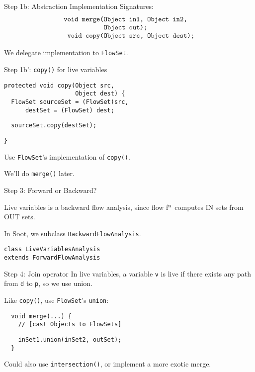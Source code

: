 \begin{slide}{Step 1b: Abstraction Implementation}
Signatures:
{\small 
\[ \mbox{\tt \begin{tabular}{r@{}l}
                 void merge(&Object in1, Object in2,\\
                            &Object out);\\
                 void copy(&Object src, Object dest);
\end{tabular}}\]
}

We delegate implementation to {\tt FlowSet}.
\end{slide}

\begin{slide}{Step 1b': {\tt copy()} for live variables}
\begin{verbatim}
protected void copy(Object src, 
                    Object dest) {
  FlowSet sourceSet = (FlowSet)src,
      destSet = (FlowSet) dest;

\end{verbatim}    
{\red\verb+  sourceSet.copy(destSet);+}
\begin{verbatim}
}
\end{verbatim}

\qquad

Use {\tt FlowSet}'s implementation of {\tt copy()}.

\qquad

We'll do {\tt merge()} later.
\end{slide}


\begin{slide}{Step 3: Forward or Backward?}

Live variables is a backward flow analysis, since flow
f$^{\mbox{\scriptsize n}}$ computes {\sf IN} sets from {\sf OUT} sets.

\qquad

In Soot, we subclass {\tt \red BackwardFlowAnalysis}.

\qquad

{\red \tt class LiveVariablesAnalysis \\ \qquad extends ForwardFlowAnalysis}
\end{slide}

\begin{slide}{Step 4: Join operator}
In live variables, a variable {\tt v} is live if there exists any path
from {\tt d} to {\tt p}, so we use union.

\qquad

Like {\tt copy()}, use {\tt FlowSet}'s {\tt union}:

\vspace*{0.05in}

\begin{verbatim}
  void merge(...) {
    // [cast Objects to FlowSets]
\end{verbatim}
{\red\verb+    inSet1.union(inSet2, outSet);+}\\
\verb+  }+

\vspace*{0.1in}

Could also use {\tt intersection()}, or implement a more exotic merge.

\end{slide}


